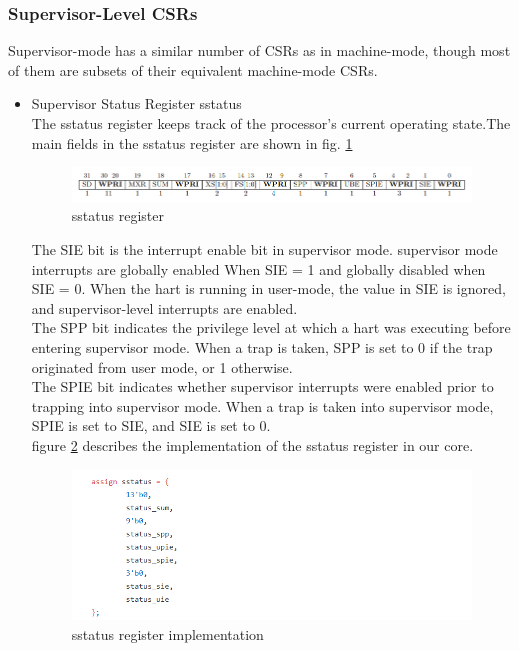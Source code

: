 \documentclass[../main.tex]{subfiles}
\begin{document}
\subsubsection{Supervisor-Level CSRs}
Supervisor-mode has a similar number of CSRs as in machine-mode, though most of them are subsets of their equivalent machine-mode CSRs.

\begin{itemize}
    \item Supervisor Status Register sstatus\\
        The sstatus register keeps track of the processor’s current operating state.The main fields in the sstatus register are shown in fig. \ref{fig:sstatus}
        \begin{figure}[h]
            \centering
            \includegraphics[width=10 cm]{diagrams/sstatus.png}
            \caption{sstatus register}
            \label{fig:sstatus}
        \end{figure}
        The SIE bit is the interrupt enable bit in supervisor mode. supervisor mode interrupts are globally enabled When SIE = 1 and globally disabled when SIE = 0. When the hart is running in user-mode, the value in SIE is ignored, and supervisor-level interrupts are enabled.\\
        The SPP bit indicates the privilege level at which a hart was executing before entering supervisor mode. When a trap is taken, SPP is set to 0 if the trap originated from user mode, or 1 otherwise.\\
        The SPIE bit indicates whether supervisor interrupts were enabled prior to trapping into supervisor mode. When a trap is taken into supervisor mode, SPIE is set to SIE, and SIE is set to 0.\\ figure \ref{fig:sstatus_imp}  describes the implementation of the sstatus register in our core.
        
        \begin{figure}[h]
            \centering
            \includegraphics[width=15 cm]{diagrams/sstatus_imp.png}
            \caption{sstatus register  implementation}
            \label{fig:sstatus_imp}
        \end{figure}
        

\end{itemize}
\end{document}
